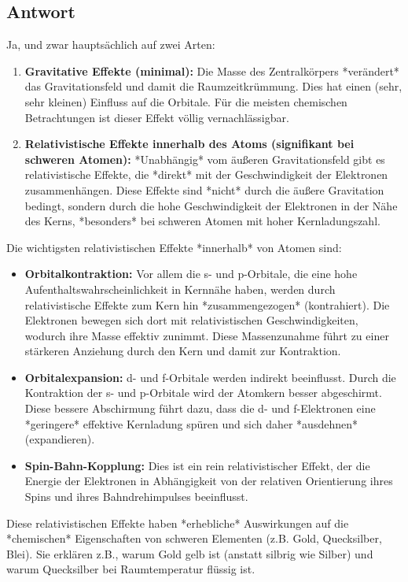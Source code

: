 \documentclass{article}
\begin{document}
	\subsection{Antwort}
	Ja, und zwar hauptsächlich auf zwei Arten:
	\begin{enumerate}
		\item \textbf{Gravitative Effekte (minimal):} Die Masse des Zentralkörpers *verändert* das Gravitationsfeld und damit die Raumzeitkrümmung. Dies hat einen (sehr, sehr kleinen) Einfluss auf die Orbitale. Für die meisten chemischen Betrachtungen ist dieser Effekt völlig vernachlässigbar.
		\item \textbf{Relativistische Effekte innerhalb des Atoms (signifikant bei schweren Atomen):} *Unabhängig* vom äußeren Gravitationsfeld gibt es relativistische Effekte, die *direkt* mit der Geschwindigkeit der Elektronen zusammenhängen.  Diese Effekte sind *nicht* durch die äußere Gravitation bedingt, sondern durch die hohe Geschwindigkeit der Elektronen in der Nähe des Kerns, *besonders* bei schweren Atomen mit hoher Kernladungszahl.
	\end{enumerate}
	
	Die wichtigsten relativistischen Effekte *innerhalb* von Atomen sind:
	\begin{itemize}
		\item \textbf{Orbitalkontraktion:} Vor allem die s- und p-Orbitale, die eine hohe Aufenthaltswahrscheinlichkeit in Kernnähe haben, werden durch relativistische Effekte zum Kern hin *zusammengezogen* (kontrahiert).  Die Elektronen bewegen sich dort mit relativistischen Geschwindigkeiten, wodurch ihre Masse effektiv zunimmt.  Diese Massenzunahme führt zu einer stärkeren Anziehung durch den Kern und damit zur Kontraktion.
		\item \textbf{Orbitalexpansion:} d- und f-Orbitale werden indirekt beeinflusst.  Durch die Kontraktion der s- und p-Orbitale wird der Atomkern besser abgeschirmt.  Diese bessere Abschirmung führt dazu, dass die d- und f-Elektronen eine *geringere* effektive Kernladung spüren und sich daher *ausdehnen* (expandieren).
		\item \textbf{Spin-Bahn-Kopplung:} Dies ist ein rein relativistischer Effekt, der die Energie der Elektronen in Abhängigkeit von der relativen Orientierung ihres Spins und ihres Bahndrehimpulses beeinflusst.
	\end{itemize}
	Diese relativistischen Effekte haben *erhebliche* Auswirkungen auf die *chemischen* Eigenschaften von schweren Elementen (z.B. Gold, Quecksilber, Blei). Sie erklären z.B., warum Gold gelb ist (anstatt silbrig wie Silber) und warum Quecksilber bei Raumtemperatur flüssig ist.
	
\end{document}

